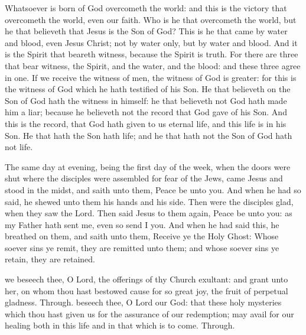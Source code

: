  Whatsoever is born of God overcometh the world: and this is the victory that overcometh the world, even our faith. Who is he that overcometh the world, but he that believeth that Jesus is the Son of God? This is he that came by water and blood, even Jesus Christ; not by water only, but by water and blood. And it is the Spirit that beareth witness, because the Spirit is truth. For there are three that bear witness, the Spirit, and the water, and the blood: and these three agree in one. If we receive the witness of men, the witness of God is greater: for this is the witness of God which he hath testified of his Son. He that believeth on the Son of God hath the witness in himself: he that believeth not God hath made him a liar; because he believeth not the record that God gave of his Son. And this is the record, that God hath given to us eternal life, and this life is in his Son. He that hath the Son hath life; and he that hath not the Son of God hath not life.


 The same day at evening, being the first day of the week, when the doors were shut where the disciples were assembled for fear of the Jews, came Jesus and stood in the midst, and saith unto them, Peace be unto you. And when he had so said, he shewed unto them his hands and his side. Then were the disciples glad, when they saw the Lord. Then said Jesus to them again, Peace be unto you: as my Father hath sent me, even so send I you. And when he had said this, he breathed on them, and saith unto them, Receive ye the Holy Ghost: Whose soever sins ye remit, they are remitted unto them; and whose soever sins ye retain, they are retained.

\secret
{} we beseech thee, O Lord, the offerings of thy Church exultant: and grant unto her, on whom thou hast bestowed cause for so great joy, the fruit of perpetual gladness. Through.
\postcommunion
{} beseech thee, O Lord our God: that these holy mysteries which thou hast given us for the assurance of our redemption; may avail for our healing both in this life and in that which is to come. Through.


